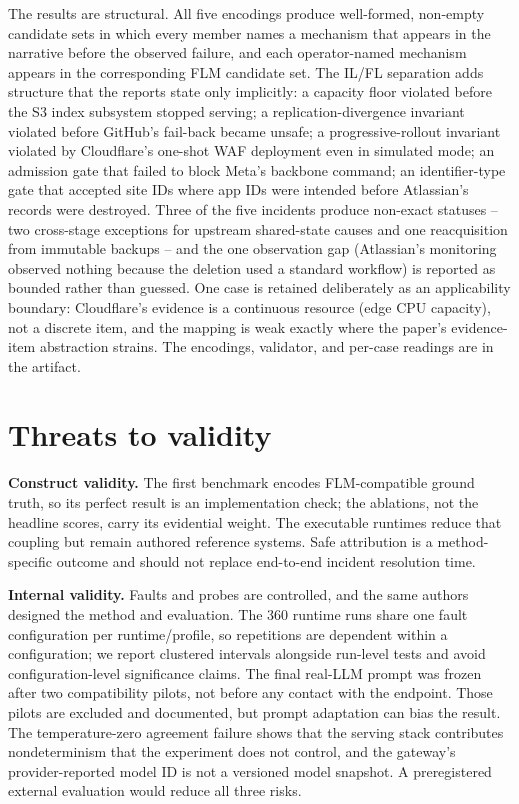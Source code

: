 \documentclass[10pt]{article}
\begin{document}
The results are structural. All five encodings produce well-formed, non-empty candidate sets in which every member names a mechanism that appears in the narrative before the observed failure, and each operator-named mechanism appears in the corresponding FLM candidate set. The IL/FL separation adds structure that the reports state only implicitly: a capacity floor violated before the S3 index subsystem stopped serving; a replication-divergence invariant violated before GitHub's fail-back became unsafe; a progressive-rollout invariant violated by Cloudflare's one-shot WAF deployment even in simulated mode; an admission gate that failed to block Meta's backbone command; an identifier-type gate that accepted site IDs where app IDs were intended before Atlassian's records were destroyed. Three of the five incidents produce non-exact statuses -- two cross-stage exceptions for upstream shared-state causes and one reacquisition from immutable backups -- and the one observation gap (Atlassian's monitoring observed nothing because the deletion used a standard workflow) is reported as bounded rather than guessed. One case is retained deliberately as an applicability boundary: Cloudflare's evidence is a continuous resource (edge CPU capacity), not a discrete item, and the mapping is weak exactly where the paper's evidence-item abstraction strains. The encodings, validator, and per-case readings are in the artifact.

\section{Threats to validity}

\textbf{Construct validity.} The first benchmark encodes FLM-compatible ground truth, so its perfect result is an implementation check; the ablations, not the headline scores, carry its evidential weight. The executable runtimes reduce that coupling but remain authored reference systems. Safe attribution is a method-specific outcome and should not replace end-to-end incident resolution time.

\textbf{Internal validity.} Faults and probes are controlled, and the same authors designed the method and evaluation. The 360 runtime runs share one fault configuration per runtime/profile, so repetitions are dependent within a configuration; we report clustered intervals alongside run-level tests and avoid configuration-level significance claims. The final real-LLM prompt was frozen after two compatibility pilots, not before any contact with the endpoint. Those pilots are excluded and documented, but prompt adaptation can bias the result. The temperature-zero agreement failure shows that the serving stack contributes nondeterminism that the experiment does not control, and the gateway's provider-reported model ID is not a versioned model snapshot. A preregistered external evaluation would reduce all three risks.
\end{document}
